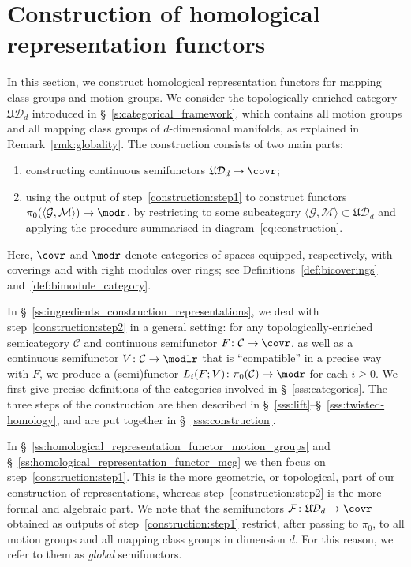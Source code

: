 \documentclass[AHL,Unicode,published]{cedram}
\newcommand{\fU}{\ensuremath{\mathfrak{U}}}
\newcommand{\cC}{\mathcal{C}}
\newcommand{\cD}{\mathcal{D}}
\newcommand{\cF}{\mathcal{F}}
\newcommand{\cG}{\mathcal{G}}
\newcommand{\cM}{\mathcal{M}}
\renewcommand{\geq}{\geqslant}
\begin{document}
\section{Construction of homological representation functors}\label{s:general_construction}

In this section, we construct homological representation functors for mapping class groups and motion groups. We consider the topologically-enriched category $\fU\cD_{d}$ introduced in \S~\ref{s:categorical_framework}, which contains all motion groups and all mapping class groups of $d$-dimensional manifolds, as explained in Remark~\ref{rmk:globality}. The construction consists of two main parts:
\begin{enumerate}
\item\label{construction:step1}
constructing continuous semifunctors $\fU\cD_{d} \to \covr$;
\item\label{construction:step2}
using the output of step~\eqref{construction:step1} to construct functors $\pi_{0}(\langle \cG, \cM \rangle) \to \modr$, by restricting to some subcategory $\langle \cG, \cM \rangle \subset \fU\cD_{d}$ and applying the procedure summarised in diagram~\eqref{eq:construction}.
\end{enumerate}
Here, $\covr$ and $\modr$ denote categories of spaces equipped, respectively, with coverings and with right modules over rings; see Definitions~\ref{def:bicoverings} and~\ref{def:bimodule_category}.

In \S~\ref{ss:ingredients_construction_representations}, we deal with step~\eqref{construction:step2} in a general setting: for any topologically-enriched semicategory $\cC$ and continuous semifunctor $F \colon \cC \to \covr$, as well as a continuous semifunctor $V \colon \cC \to \modlr$ that is ``compatible'' in a precise way with $F$, we produce a (semi)functor $L_{i}(F;V) \colon \pi_{0}(\cC) \to \modr$ for each $i\geq 0$. We first give precise definitions of the categories involved in \S~\ref{sss:categories}. The three steps of the construction are then described in \S~\ref{sss:lift}--\S~\ref{sss:twisted-homology}, and are put together in \S~\ref{sss:construction}.

In \S~\ref{ss:homological_representation_functor_motion_groups} and \S~\ref{ss:homological_representation_functor_mcg} we then focus on step~\eqref{construction:step1}. This is the more geometric, or topological, part of our construction of representations, whereas step~\eqref{construction:step2} is the more formal and algebraic part. We note that the semifunctors $\cF \colon \fU\cD_{d} \to \covr$ obtained as outputs of step~\eqref{construction:step1} restrict, after passing to $\pi_0$, to all motion groups and all mapping class groups in dimension $d$. For this reason, we refer to them as \emph{global} semifunctors.
\end{document}
